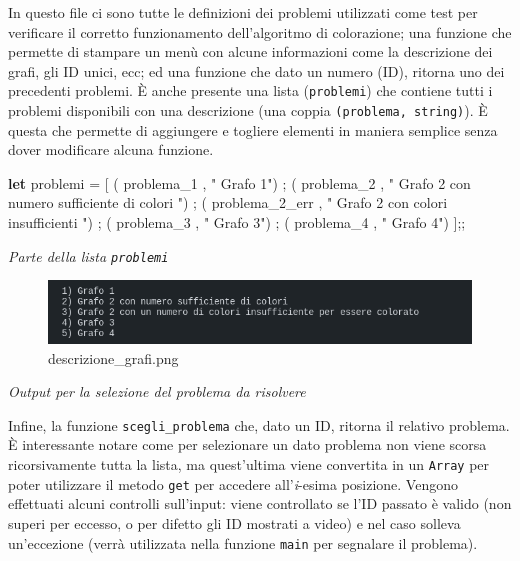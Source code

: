 \documentclass[11pt]{article}
\newenvironment{Shaded}{}{}
\newcommand{\KeywordTok}[1]{\textcolor[rgb]{0.00,0.44,0.13}{\textbf{{#1}}}}
\newcommand{\StringTok}[1]{\textcolor[rgb]{0.25,0.44,0.63}{{#1}}}
\newcommand{\NormalTok}[1]{{#1}}
\begin{document}
    In questo file ci sono tutte le definizioni dei problemi utilizzati come
test per verificare il corretto funzionamento dell'algoritmo di
colorazione; una funzione che permette di stampare un menù con alcune
informazioni come la descrizione dei grafi, gli ID unici, ecc; ed una
funzione che dato un numero (ID), ritorna uno dei precedenti problemi. È
anche presente una lista (\texttt{problemi}) che contiene tutti i
problemi disponibili con una descrizione (una coppia
\texttt{(problema,\ string)}). È questa che permette di aggiungere e
togliere elementi in maniera semplice senza dover modificare alcuna
funzione.

    \begin{Shaded}
\begin{Highlighting}[]
\KeywordTok{let}\NormalTok{ problemi = [}
\NormalTok{    ( problema\_1 , }\StringTok{" Grafo 1"}\NormalTok{) ;}
\NormalTok{    ( problema\_2 , }\StringTok{" Grafo 2 con numero sufficiente di colori "}\NormalTok{) ;}
\NormalTok{    ( problema\_2\_err , }\StringTok{" Grafo 2 con colori insufficienti "}\NormalTok{) ;}
\NormalTok{    ( problema\_3 , }\StringTok{" Grafo 3"}\NormalTok{) ;}
\NormalTok{    ( problema\_4 , }\StringTok{" Grafo 4"}\NormalTok{)}
\NormalTok{];;}
\end{Highlighting}
\end{Shaded}

\emph{Parte della lista \texttt{problemi}}

    \begin{figure}
\centering
\includegraphics{Colored Camel_files/descrizionegrafi.png}
\caption{descrizione\_grafi.png}
\end{figure}

\emph{Output per la selezione del problema da risolvere}

    Infine, la funzione \texttt{scegli\_problema} che, dato un ID, ritorna
il relativo problema. È interessante notare come per selezionare un dato
problema non viene scorsa ricorsivamente tutta la lista, ma quest'ultima
viene convertita in un \texttt{Array} per poter utilizzare il metodo
\texttt{get} per accedere all'\emph{i}-esima posizione. Vengono
effettuati alcuni controlli sull'input: viene controllato se l'ID
passato è valido (non superi per eccesso, o per difetto gli ID mostrati
a video) e nel caso solleva un'eccezione (verrà utilizzata nella
funzione \texttt{main} per segnalare il problema).
\end{document}
